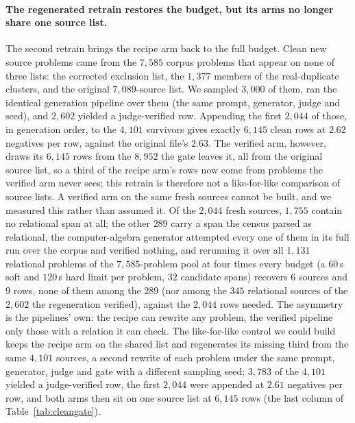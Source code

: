 \paragraph{The regenerated retrain restores the budget, but its arms no longer share one source list.}
The second retrain brings the recipe arm back to the full budget. Clean new source problems came from the $7{,}585$ corpus problems that appear on none of three lists: the corrected exclusion list, the $1{,}377$ members of the real-duplicate clusters, and the original $7{,}089$-source list. We sampled $3{,}000$ of them, ran the identical generation pipeline over them (the same prompt, generator, judge and seed), and $2{,}602$ yielded a judge-verified row. Appending the first $2{,}044$ of those, in generation order, to the $4{,}101$ survivors gives exactly $6{,}145$ clean rows at $2.62$ negatives per row, against the original file's $2.63$. The verified arm, however, draws its $6{,}145$ rows from the $8{,}952$ the gate leaves it, all from the original source list, so a third of the recipe arm's rows now come from problems the verified arm never sees; this retrain is therefore not a like-for-like comparison of source lists. A verified arm on the same fresh sources cannot be built, and we measured this rather than assumed it. Of the $2{,}044$ fresh sources, $1{,}755$ contain no relational span at all; the other $289$ carry a span the census parsed as relational, the computer-algebra generator attempted every one of them in its full run over the corpus and verified nothing, and rerunning it over all $1{,}131$ relational problems of the $7{,}585$-problem pool at four times every budget (a $60$\,s soft and $120$\,s hard limit per problem, $32$ candidate spans) recovers $6$ sources and $9$ rows, none of them among the $289$ (nor among the $345$ relational sources of the $2{,}602$ the regeneration verified), against the $2{,}044$ rows needed. The asymmetry is the pipelines' own: the recipe can rewrite any problem, the verified pipeline only those with a relation it can check. The like-for-like control we could build keeps the recipe arm on the shared list and regenerates its missing third from the same $4{,}101$ sources, a second rewrite of each problem under the same prompt, generator, judge and gate with a different sampling seed; $3{,}783$ of the $4{,}101$ yielded a judge-verified row, the first $2{,}044$ were appended at $2.61$ negatives per row, and both arms then sit on one source list at $6{,}145$ rows (the last column of Table~\ref{tab:cleangate}).

